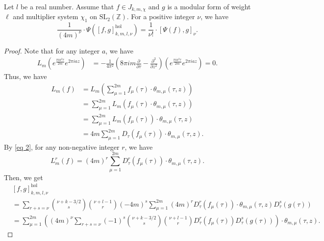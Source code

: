 \documentclass[10pt,a4paper]{amsart}
\begin{document}
\begin{thm}\label{thm 7}
    Let $l$ be a real number.
    Assume that $f\in J_{k,m,\chi}$ and $g$ is a modular form of weight $\ell$ and multiplier system $\chi_1$ on $\mathrm{SL}_{2}(\mathbb{Z})$. 
    For a positive integer $\nu$, we have 
    \[  \frac{1}{(4m)^{\nu}}\cdot\Psi\left([f,g]^{\mathrm{hol}}_{k,m,l,\nu}\right) = \frac{1}{\nu !}\cdot[\Psi(f),g]_{\nu}. \]
\end{thm}

\begin{proof}
    Note that for any integer $a$, we have 
    \begin{equation*}
        \begin{aligned}
            L_m\left(e^{\frac{\pi i a^2\tau}{2m}}e^{2\pi i a z}\right)&=-\frac{1}{4\pi^2}\left(8\pi i m \frac{\partial}{\partial \tau} - \frac{\partial^2}{\partial z^2}\right)\left(e^{\frac{\pi i a^2\tau}{2m}}e^{2\pi i a z}\right)=0.
        \end{aligned}
    \end{equation*}
    Thus, we have 
    \begin{equation}\label{eq 2}
    \begin{aligned}
        L_m\left(f\right)&=L_m\left(\sum_{\mu=1}^{2m} f_{\mu}(\tau)\cdot \theta_{m,\mu}(\tau,z)\right)\\
        &=\sum_{\mu=1}^{2m} L_m\left(f_{\mu}(\tau)\cdot \theta_{m,\mu}(\tau,z) \right)\\
        &=\sum_{\mu=1}^{2m} L_m\left(f_{\mu}(\tau)\right)\cdot \theta_{m,\mu}(\tau,z)\\
        &=4m \sum_{\mu=1}^{2m} D_{\tau}(f_{\mu}(\tau))\cdot \theta_{m,\mu}(\tau,z).
    \end{aligned}
    \end{equation}
    By \eqref{eq 2}, for any non-negative integer $r$, we have 
    \[ L_m^{r}\left(f\right) = (4m)^{r}\sum_{\mu=1}^{2m} D_{\tau}^{r}(f_{\mu}(\tau))\cdot \theta_{m,\mu}(\tau,z).  \]
    Then, we get 
    \begin{equation*}
        \begin{aligned}
            &[f,g]^{\mathrm{hol}}_{k,m,l,\nu}\\
            &=\sum_{r+s=\nu}\binom{\nu+k-3/2}{s}\binom{\nu+l-1}{r} (-4m)^{s}\sum_{\mu=1}^{2m} (4m)^{r} D_{\tau}^{r}(f_{\mu}(\tau))\cdot \theta_{m,\mu}(\tau,z) D_{\tau}^{s}(g(\tau))\\
            &=\sum_{\mu=1}^{2m}\left((4m)^{\nu}\sum_{r+s=\nu}(-1)^{s}\binom{\nu+k-3/2}{s}\binom{\nu+l-1}{r} D_{\tau}^{r}(f_{\mu}(\tau))D_{\tau}^{s}(g(\tau))\right)\cdot \theta_{m,\mu}(\tau,z).

\end{aligned}
\end{equation*}
\end{proof}
\end{document}
